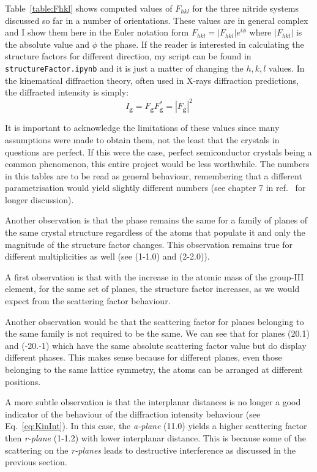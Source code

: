 %
Table~\ref{table:Fhkl} shows computed values of $F_{hkl}$ for the three nitride systems discussed so far in a number of orientations. These values are in general complex and I show them here in the Euler notation form $F_{hkl}=|F_{hkl}| e^{i\phi}$ where $|F_{hkl}|$ is the absolute value and $\phi$ the phase.  If the reader is interested in calculating the structure factors for different direction, my script can be found in \texttt{structureFactor.ipynb} and it is just a matter of changing the $h, k, l$ values. In the kinematical diffraction theory, often used in X-rays diffraction predictions, the diffracted intensity is simply:
\begin{equation}
\label{eq:KinInt}
 I_\mathbf{g} = F_\mathbf{g} F^*_\mathbf{g} =|F_\mathbf{g}|^2   
\end{equation}


It is important to acknowledge the limitations of these values since many assumptions were made to obtain them, not the least that the crystals in questions are perfect. If this were the case, perfect semiconductor crystals being a common phenomenon, this entire project would be less worthwhile. The numbers in this tables are to be read as general behaviour, remembering that a different parametrisation would yield slightly different numbers (see chapter 7 in ref.~\cite{TheoryandPractice} for longer discussion).



Another observation is that the phase remains the same for a family of planes of the same crystal structure regardless of the atoms that populate it and only the magnitude of the structure factor changes. This observation remains true for different multiplicities as well (see \hkl(1-1.0) and \hkl(2-2.0)).

A first observation is that with the increase in the atomic mass of the group-III element, for the same set of planes, the structure factor increases, as we would expect from the scattering factor behaviour. 

Another observation would be that the scattering factor for planes belonging to the same family is not required to be the same. We can see that for planes \hkl(20.1) and \hkl(-20.-1) which have the same absolute scattering factor value but do display different phases. This makes sense because for different planes, even those belonging to the same lattice symmetry, the atoms can be arranged at different positions. 


A more subtle observation is that the interplanar distances is no longer a good indicator of the behaviour of the diffraction intensity behaviour (see Eq.~\ref{eq:KinInt}). In this case, the \textit{a-plane} \hkl(11.0) yields a higher scattering factor then \textit{r-plane} \hkl(1-1.2) with lower interplanar distance. This is because some of the scattering on the \textit{r-planes} leads to destructive interference as discussed in the previous section. 


